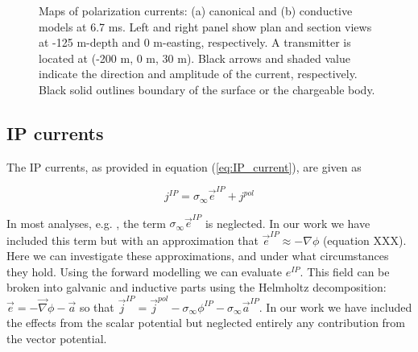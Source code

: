 \documentclass[extra,mreferee]{gji}
\newcommand{\grad}{\vec \nabla}
\newcommand{\siginf}{\sigma_\infty}
\renewcommand {\j}  { {\vec j} }
\newcommand {\e}  { {\vec e} }
\begin{document}
\begin{figure}
  \caption{Maps of polarization currents: (a) canonical and (b) conductive models at 6.7 ms. Left and right panel show plan and section views at -125 m-depth and 0 m-easting, respectively. A transmitter is located at (-200 m, 0 m, 30 m). Black arrows and shaded value indicate the direction and amplitude of the current, respectively. Black solid outlines boundary of the surface or the chargeable body.}
  \label{F:Polarizationcurrent_late}
\end{figure}
\clearpage

\subsection{IP currents}

The IP currents, as provided in equation (\ref{eq:IP_current}), are given as 
\begin{linenomath*}
\begin{equation}
  j^{IP}=\siginf  \e^{IP} + j^{pol}
\end{equation}
\end{linenomath*}
In most analyses, e.g. \cite{Smith1988a}, the term $\siginf \e^{IP}$ is neglected. In our work we have included this term but with an approximation that $\e^{IP} \approx -\nabla \phi$  (equation XXX). Here we can investigate these approximations, and under what circumstances they hold. Using the forward modelling we can evaluate $e^{IP}$.
This field can be broken into galvanic and inductive parts using the Helmholtz decomposition: $\e=-\grad \phi-\vec{a}$ so that $\j^{IP} = \j^{pol} -\siginf \phi^{IP} - \siginf \vec{a}^{IP}$.
In our work we have included the effects from the scalar potential but neglected entirely any contribution from the vector potential. 
\end{document}
